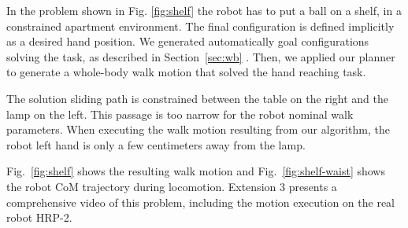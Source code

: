 \documentclass{article}
\begin{document}
In the problem shown in Fig. \ref{fig:shelf} the robot has to put a ball on a
shelf, in a constrained apartment environment. The final configuration is defined 
implicitly as a desired hand position. We generated automatically goal configurations 
solving the task, as described in Section~\ref{sec:wb} . Then, we 
applied our planner to generate a whole-body walk motion that solved the hand reaching
task. 

The solution sliding path is constrained between the table on the right and the lamp
on the left. This passage is too narrow for the robot nominal walk parameters. 
When executing the walk motion resulting from our algorithm, the robot left hand
is only a few centimeters away from the lamp.

Fig.~\ref{fig:shelf} shows the resulting walk motion and Fig.~\ref{fig:shelf-waist} 
shows the robot CoM trajectory during locomotion. Extension 3 presents a 
comprehensive video of this problem, including the motion execution on
the real robot HRP-2.
\end{document}
